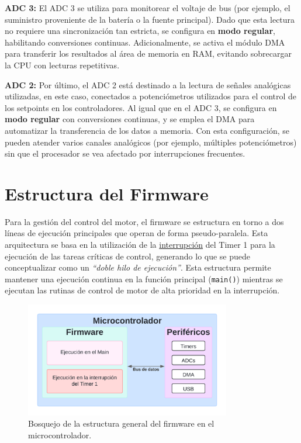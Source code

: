 \documentclass[11pt]{report}
\begin{document}
\textbf{ADC 3:} El ADC 3 se utiliza para monitorear el voltaje de bus (por ejemplo, el suministro proveniente de la batería o la fuente principal). Dado que esta lectura no requiere una sincronización tan estricta, se configura en \textbf{modo regular}, habilitando conversiones continuas. Adicionalmente, se activa el módulo DMA para transferir los resultados al área de memoria en RAM, evitando sobrecargar la CPU con lecturas repetitivas.

\textbf{ADC 2:} Por último, el ADC 2 está destinado a la lectura de señales analógicas utilizadas, en este caso, conectados a potenciómetros utilizados para el control de los setpoints en los controladores. Al igual que en el ADC 3, se configura en \textbf{modo regular} con conversiones continuas, y se emplea el DMA para automatizar la transferencia de los datos a memoria. Con esta configuración, se pueden atender varios canales analógicos (por ejemplo, múltiples potenciómetros) sin que el procesador se vea afectado por interrupciones frecuentes.

\section{Estructura del Firmware}

Para la gestión del control del motor, el firmware se estructura en torno a dos líneas de ejecución principales que operan de forma pseudo-paralela. Esta arquitectura se basa en la utilización de la \href{https://www.youtube.com/watch?v=poa_QBvtIBA}{interrupción} del Timer 1 para la ejecución de las tareas críticas de control, generando lo que se puede conceptualizar como un \emph{``doble hilo de ejecución''}.  Esta estructura permite mantener una ejecución continua en la función principal (\texttt{main()}) mientras se ejecutan las rutinas de control de motor de alta prioridad en la interrupción. 

\begin{figure}[ht]
	\centering
	\includegraphics[width=0.8\textwidth]{imagenes/Diagramas/lineas de ejecucion.png}
	\caption{Bosquejo de la estructura general del firmware en el microcontrolador.}
	\label{firmware_microcontrolador}
\end{figure}
\FloatBarrier
\end{document}
